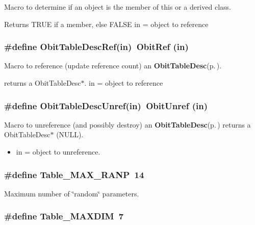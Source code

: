 Macro to determine if an object is the member of this or a derived class. 

Returns TRUE if a member, else FALSE in = object to reference 
\subsubsection{\setlength{\rightskip}{0pt plus 5cm}\#define Obit\-Table\-Desc\-Ref(in)\ Obit\-Ref (in)}\label{ObitTableDesc_8h_a1}


Macro to reference (update reference count) an {\bf Obit\-Table\-Desc}{\rm (p.\,\pageref{structObitTableDesc})}. 

returns a Obit\-Table\-Desc$\ast$. in = object to reference 
\subsubsection{\setlength{\rightskip}{0pt plus 5cm}\#define Obit\-Table\-Desc\-Unref(in)\ Obit\-Unref (in)}\label{ObitTableDesc_8h_a0}


Macro to unreference (and possibly destroy) an {\bf Obit\-Table\-Desc}{\rm (p.\,\pageref{structObitTableDesc})} returns a Obit\-Table\-Desc$\ast$ (NULL). 

\begin{itemize}
\item in = object to unreference. \end{itemize}
\subsubsection{\setlength{\rightskip}{0pt plus 5cm}\#define Table\_\-MAX\_\-RANP\ 14}\label{ObitTableDesc_8h_a4}


Maximum number of \char`\"{}random\char`\"{} parameters. 

\subsubsection{\setlength{\rightskip}{0pt plus 5cm}\#define Table\_\-MAXDIM\ 7}\label{ObitTableDesc_8h_a3}


